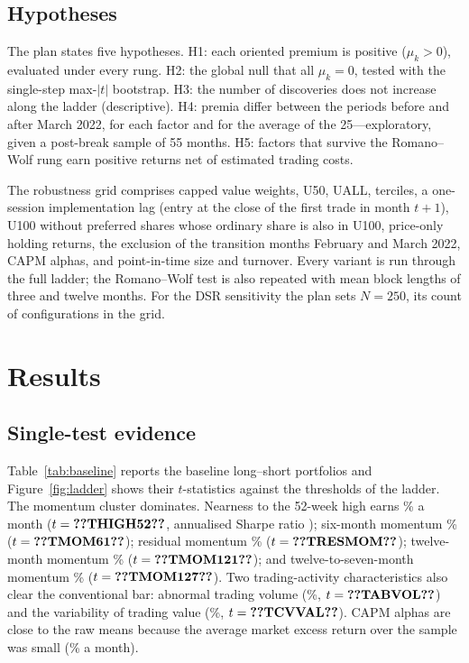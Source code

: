 \documentclass[11pt]{article}
\newcommand{\RW}{Romano--Wolf}
\begin{document}
\subsection{Hypotheses}

The plan states five hypotheses. H1: each oriented premium is positive ($\mu_k>0$), evaluated under every rung. H2:
the global null that all $\mu_k=0$, tested with the single-step max-$|t|$ bootstrap. H3: the number of discoveries does
not increase along the ladder (descriptive). H4: premia differ between the periods before and after March 2022, for
each factor and for the average of the 25---exploratory, given a post-break sample of 55 months. H5: factors that
survive the \RW{} rung earn positive returns net of estimated trading costs.

The robustness grid comprises capped value weights, U50, UALL, terciles, a one-session implementation lag (entry at the
close of the first trade in month $t+1$), U100 without preferred shares whose ordinary share is also in U100,
price-only holding returns, the exclusion of the transition months February and March 2022, CAPM alphas, and
point-in-time size and turnover. Every variant is run through the full ladder; the \RW{} test is also repeated with
mean block lengths of three and twelve months. For the DSR sensitivity the plan sets $N=250$, its count of
configurations in the grid.

\section{Results}\label{sec:results}

\subsection{Single-test evidence}

Table~\ref{tab:baseline} reports the baseline long--short portfolios and Figure~\ref{fig:ladder} shows their
$t$-statistics against the thresholds of the ladder. The momentum cluster dominates. Nearness to the 52-week high
earns \% a month ($t=\val{THIGH52}$, annualised Sharpe ratio ); six-month momentum
\% ($t=\val{TMOM61}$); residual momentum \% ($t=\val{TRESMOM}$); twelve-month momentum
\% ($t=\val{TMOM121}$); and twelve-to-seven-month momentum \% ($t=\val{TMOM127}$). Two
trading-activity characteristics also clear the conventional bar: abnormal trading volume (\%,
$t=\val{TABVOL}$) and the variability of trading value (\%, $t=\val{TCVVAL}$). CAPM alphas are close to
the raw means because the average market excess return over the sample was small (\% a month).
\end{document}
